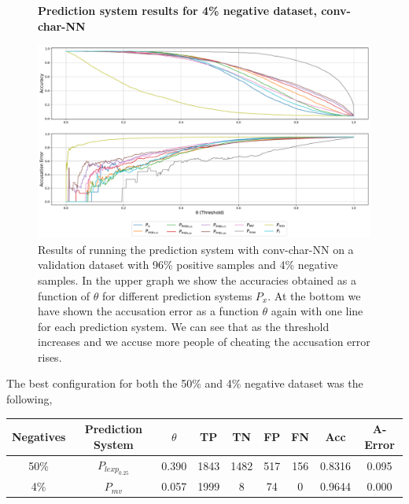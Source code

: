 \begin{figure}
    \centering
    \textbf{Prediction system results for 4\% negative dataset, \gls{conv-char-NN}}\par\medskip
    \includegraphics[scale=0.33]{./pictures/experiments/conv_char_nn/prediction_system_04}
    \caption{Results of running the prediction system with \gls{conv-char-NN}
        on a validation dataset with 96\% positive samples and 4\% negative
        samples. In the upper graph we show the accuracies obtained as a
        function of $\theta$ for different prediction systems $P_x$. At the
        bottom we have shown the accusation error as a function $\theta$ again
        with one line for each prediction system. We can see that as the
        threshold increases and we accuse more people of cheating the accusation
        error rises.}
    \label{fig:conv-char-NN-pred-4}
\end{figure}

The best configuration for both the 50\% and 4\% negative dataset was the
following,

\begin{adjustbox}{center}
    \begin{tabular}{|c|c|c|c|c|c|c|c|c|}
        \hline
        Negatives  & Prediction System & $\theta$ & TP   & TN   & FP  & FN  &
        Acc        & A-Error
        \\ \hline
        50\%       & $P_{lexp_{0.25}}$ & 0.390    & 1843 & 1482 & 517 & 156 &
        0.8316     & 0.095
        \\ \hline
        4\%        & $P_{mv}$          & 0.057    & 1999 & 8    & 74  & 0   &
        0.9644     & 0.000
        \\ \hline
    \end{tabular}
\end{adjustbox}


